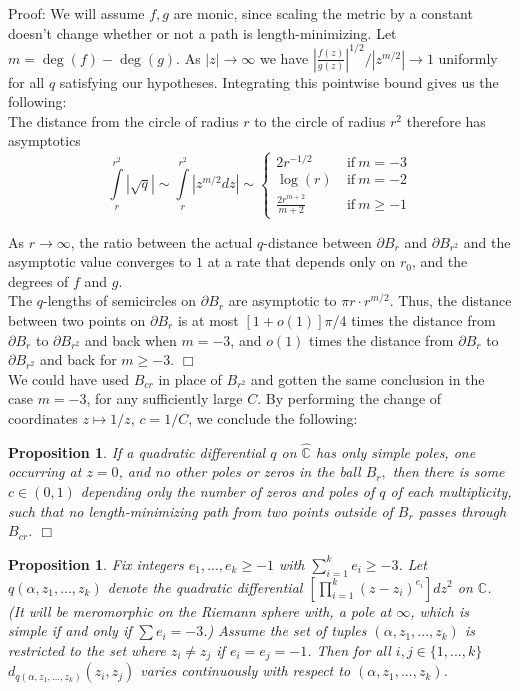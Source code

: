 \documentclass[12pt]{article}
\newtheorem{proposition}[theorem]{Proposition}
\newcommand{\cc}{\mathbb{C}}
\begin{document}
\noindent Proof: We will assume $f,g$ are monic, since scaling the metric by a constant doesn't change whether or not a path is length-minimizing. Let $m = \deg(f) - \deg(g)$. As $|z| \to \infty$ we have $|\frac{f(z)}{g(z)}|^{1/2}/|z^{m/2}| \to 1$ uniformly for all $q$ satisfying our hypotheses. Integrating this pointwise bound gives us the following:\\

\noindent The distance from the circle of radius $r$ to the circle of radius $r^2$ therefore has asymptotics $$\int\limits_r^{r^2} |\sqrt{q}| \sim \int\limits_r^{r^2} |z^{m/2}dz| \sim \left\{ \begin{array}{rl}
2 r^{-1/2} & \mathrm{~if~} m = -3 \\
\log(r) & \mathrm{~if~} m = -2 \\
\frac{2r^{m+2}}{m+2} & \mathrm{~if~} m \geq -1
\end{array} \right. $$

\noindent As $r \to \infty$, the ratio between the actual $q$-distance between $\partial B_r$ and $\partial B_{r^2}$ and the asymptotic value converges to $1$ at a rate that depends only on $r_0$, and the degrees of $f$ and $g$.\\

\noindent The $q$-lengths of semicircles on $\partial B_r$ are asymptotic to $\pi r\cdot r^{m/2}$. Thus, the distance between two points on $\partial B_r$ is at most $[1 + o(1)]\pi/4$ times the distance from $\partial B_r$ to $\partial B_{r^2}$ and back when $m = -3$, and $o(1)$ times the distance from $\partial B_r$ to $\partial B_{r^2}$ and back for $m \geq -3$. $\Box$\\

\noindent We could have used $B_{cr}$ in place of $B_{r^2}$ and gotten the same conclusion in the case $m = -3$, for any sufficiently large $C$. By performing the change of coordinates $z \mapsto 1/z$, $c = 1/C$, we conclude the following:

\begin{proposition} If a quadratic differential $q$ on $\hat{\cc}$ has only simple poles, one occurring at $z = 0$, and no other poles or zeros in the ball $B_r,$ then there is some $c \in (0,1)$ depending only the number of zeros and poles of $q$ of each multiplicity, such that no length-minimizing path from two points outside of $B_r$ passes through $B_{cr}$. $\Box$\end{proposition}

\begin{proposition}\label{PropContinDiam}Fix integers $e_1,...,e_k \geq -1$ with $\sum\limits_{i = 1}^k e_i \geq -3$. Let $q(\alpha,z_1,...,z_k)$ denote the quadratic differential $\left[\prod\limits_{i=1}^k (z-z_i)^{e_i}\right]dz^2$ on $\cc$. (It will be meromorphic on the Riemann sphere with, a pole at $\infty$, which is simple if and only if $\sum e_i = -3$.) Assume the set of tuples $(\alpha,z_1,...,z_k)$ is restricted to the set where $z_i \neq z_j$ if $e_i = e_j = -1$. Then for all $i,j \in \{1,...,k\}$ $d_{q(\alpha,z_1,...,z_k)}(z_i,z_j)$ varies continuously with respect to $(\alpha,z_1,...,z_k)$.\end{proposition}
\end{document}
